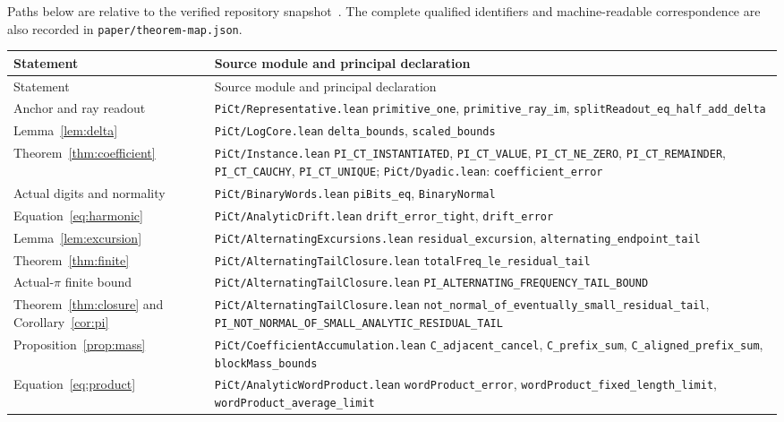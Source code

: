\documentclass[11pt,a4paper]{article}
\theoremstyle{definition}
\theoremstyle{remark}
\newcommand{\code}[1]{{\small\nolinkurl{#1}}}
\begin{document}
Paths below are relative to the verified repository snapshot~\cite{repo}.
The complete qualified identifiers and machine-readable correspondence
are also recorded in \code{paper/theorem-map.json}.

\small
\begin{longtable}{@{}>{\raggedright\arraybackslash}p{}>{\raggedright\arraybackslash}p{}@{}}
\toprule
Statement & Source module and principal declaration\\
\midrule
\endfirsthead
\toprule
Statement & Source module and principal declaration\\
\midrule
\endhead
Anchor and ray readout &
\code{PiCt/Representative.lean}\newline
\code{primitive_one}, \code{primitive_ray_im},
\code{splitReadout_eq_half_add_delta}\\[5pt]
Lemma~\ref{lem:delta} &
\code{PiCt/LogCore.lean}\newline
\code{delta_bounds}, \code{scaled_bounds}\\[5pt]
Theorem~\ref{thm:coefficient} &
\code{PiCt/Instance.lean}\newline
\code{PI_CT_INSTANTIATED}, \code{PI_CT_VALUE},
\code{PI_CT_NE_ZERO}, \code{PI_CT_REMAINDER},
\code{PI_CT_CAUCHY}, \code{PI_CT_UNIQUE};
\code{PiCt/Dyadic.lean}: \code{coefficient_error}\\[5pt]
Actual digits and normality &
\code{PiCt/BinaryWords.lean}\newline
\code{piBits_eq}, \code{BinaryNormal}\\[5pt]
Equation~\eqref{eq:harmonic} &
\code{PiCt/AnalyticDrift.lean}\newline
\code{drift_error_tight}, \code{drift_error}\\[5pt]
Lemma~\ref{lem:excursion} &
\code{PiCt/AlternatingExcursions.lean}\newline
\code{residual_excursion}, \code{alternating_endpoint_tail}\\[5pt]
Theorem~\ref{thm:finite} &
\code{PiCt/AlternatingTailClosure.lean}\newline
\code{totalFreq_le_residual_tail}\\[5pt]
Actual-$\pi$ finite bound &
\code{PiCt/AlternatingTailClosure.lean}\newline
\code{PI_ALTERNATING_FREQUENCY_TAIL_BOUND}\\[5pt]
Theorem~\ref{thm:closure} and Corollary~\ref{cor:pi} &
\code{PiCt/AlternatingTailClosure.lean}\newline
\code{not_normal_of_eventually_small_residual_tail},
\code{PI_NOT_NORMAL_OF_SMALL_ANALYTIC_RESIDUAL_TAIL}\\[5pt]
Proposition~\ref{prop:mass} &
\code{PiCt/CoefficientAccumulation.lean}\newline
\code{C_adjacent_cancel}, \code{C_prefix_sum},
\code{C_aligned_prefix_sum}, \code{blockMass_bounds}\\[5pt]
Equation~\eqref{eq:product} &
\code{PiCt/AnalyticWordProduct.lean}\newline
\code{wordProduct_error}, \code{wordProduct_fixed_length_limit},
\code{wordProduct_average_limit}\\
\bottomrule
\end{longtable}
\normalsize
\end{document}
